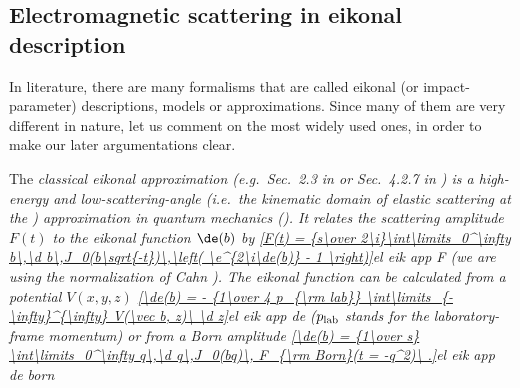 \subsection[em sc eik]{Electromagnetic scattering in eikonal description}

In literature, there are many formalisms that are called eikonal (or impact-parameter) descriptions, models or approximations. Since many of them are very different in nature, let us comment on the most widely used ones, in order to make our later argumentations clear.

The \em{classical eikonal approximation} (e.g.~Sec.~2.3 in  or Sec.~4.2.7 in ) is a high-energy and low-scattering-angle (i.e.~the kinematic domain of elastic scattering at the ) approximation in quantum mechanics (). It relates the scattering amplitude $F(t)$ to the eikonal function $\de(b)$ by
\eqref{F(t) = {s\over 2\i}\int\limits_0^\infty b\,\d b\,J_0(b\sqrt{-t})\,\left( \e^{2\i\de(b)} - 1 \right)}{el eik app F}
(we are using the normalization of Cahn ). The \em{eikonal} function can be calculated from a potential $V(x, y, z)$
\eqref{\de(b) = - {1\over 4 p_{\rm lab}} \int\limits_{-\infty}^{\infty} V(\vec b, z)\ \d z}{el eik app de}
($p_{\rm lab}$ stands for the laboratory-frame momentum) or from a Born amplitude
\eqref{\de(b) = {1\over s} \int\limits_0^\infty q\,\d q\,J_0(bq)\, F_{\rm Born}(t = -q^2)\ .}{el eik app de born}

